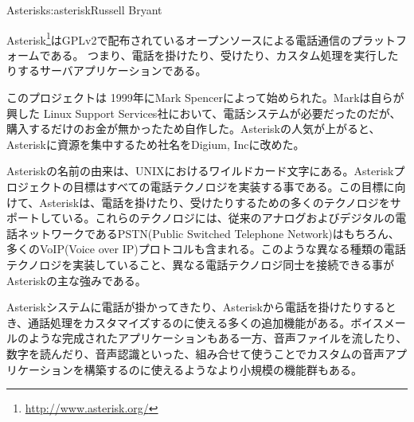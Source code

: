 \begin{aosachapter}{Asterisk}{s:asterisk}{Russell Bryant}

Asterisk\footnote{\url{http://www.asterisk.org/}}はGPLv2で配布されているオープンソースによる電話通信のプラットフォームである。
つまり、電話を掛けたり、受けたり、カスタム処理を実行したりするサーバアプリケーションである。

このプロジェクトは 1999年にMark Spencerによって始められた。Markは自らが興した Linux Support Services社において、電話システムが必要だったのだが、購入するだけのお金が無かったため自作した。Asteriskの人気が上がると、Asteriskに資源を集中するため社名をDigium, Incに改めた。

Asteriskの名前の由来は、UNIXにおけるワイルドカード文字\code{*}にある。Asteriskプロジェクトの目標はすべての電話テクノロジを実装する事である。この目標に向けて、Asteriskは、電話を掛けたり、受けたりするための多くのテクノロジをサポートしている。これらのテクノロジには、従来のアナログおよびデジタルの電話ネットワークであるPSTN(Public Switched Telephone Network)はもちろん、多くのVoIP(Voice over IP)プロトコルも含まれる。このような異なる種類の電話テクノロジを実装していること、異なる電話テクノロジ同士を接続できる事がAsteriskの主な強みである。

Asteriskシステムに電話が掛かってきたり、Asteriskから電話を掛けたりするとき、通話処理をカスタマイズするのに使える多くの追加機能がある。ボイスメールのような完成されたアプリケーションもある一方、音声ファイルを流したり、数字を読んだり、音声認識といった、組み合せて使うことでカスタムの音声アプリケーションを構築するのに使えるようなより小規模の機能群もある。


\end{aosachapter}
